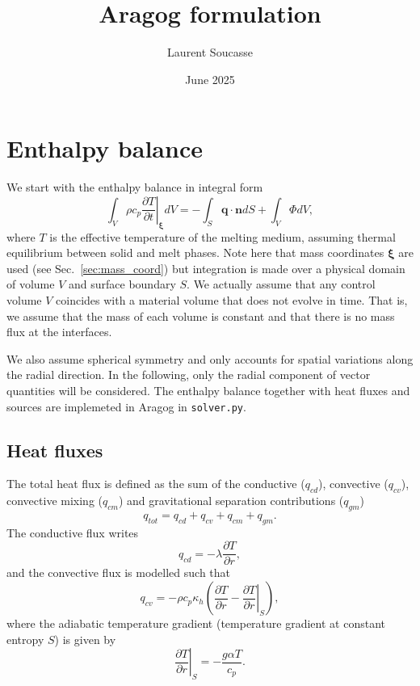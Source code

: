\documentclass{article}
\title{Aragog formulation}
\date{June 2025}
\author{Laurent Soucasse}
\renewcommand{\vec}[1]{\boldsymbol{#1}}
\begin{document}
\maketitle

\tableofcontents

\section{Enthalpy balance}

We start with the enthalpy balance in integral form
\begin{equation}
\int_V \rho c_p \left.\frac{\partial T}{\partial t}\right|_{\vec{\xi}} dV =  -\int_S \vec{q}\cdot\vec{n} dS + \int_V \Phi dV,
\label{eq.enthalpybalance}
\end{equation}
where $T$ is the effective temperature of the melting medium, assuming thermal equilibrium between solid and melt phases. Note here that mass coordinates $\vec{\xi}$ are used (see Sec.~\ref{sec:mass_coord}) but integration is made over a physical domain of volume $V$ and surface boundary $S$. We actually assume that any control volume $V$ coincides with a material volume that does not evolve in time. That is, we assume that the mass of each volume is constant and that there is no mass flux at the interfaces.

We also assume spherical symmetry and only accounts for spatial variations along the radial direction. In the following, only the radial component of vector quantities will be considered.
The enthalpy balance together with heat fluxes and sources are implemeted in Aragog in \texttt{solver.py}.

\subsection{Heat fluxes}
The total heat flux is defined as the sum of the conductive ($q_{cd}$), convective ($q_{cv}$), convective mixing ($q_{cm}$) and gravitational separation contributions ($q_{gm}$)
\begin{equation}
q_{tot}= q_{cd} + q_{cv} + q_{cm} + q_{gm}.
\end{equation}
The conductive flux writes
\begin{equation}
    q_{cd} = -\lambda \frac{\partial T}{\partial r},
    \label{eq.qcd}
\end{equation}
and the convective flux is modelled such that
\begin{equation}
    q_{cv} = -\rho c_p \kappa_h \left( \frac{\partial T}{\partial r} - \left.\frac{\partial T}{\partial r}\right|_S\right),
    \label{eq.qcv}
\end{equation}
where the adiabatic temperature gradient (temperature gradient at constant entropy $S$) is given by
\begin{equation}
    \left.\frac{\partial T}{\partial r}\right|_S = -\frac{g\alpha T}{c_p}.
    \label{eq.adiabat}
\end{equation}
\end{document}
